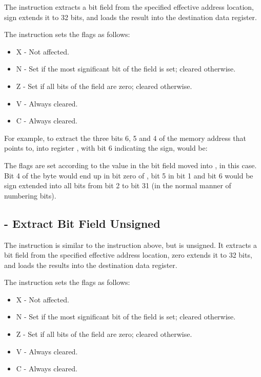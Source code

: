 The  instruction extracts a bit field from the specified effective address location, sign extends it to 32 bits, and loads the result into the destination data register.

The instruction sets the flags as follows:

\begin{itemize}
\item X - Not affected.
\item N - Set if the most significant bit of the field is set; cleared otherwise.
\item Z - Set if all bits of the field are zero; cleared otherwise.
\item V - Always cleared.
\item C - Always cleared.
\end{itemize}

For example, to extract the three bits 6, 5 and 4 of the memory address that  points to, into register , with bit 6 indicating the sign, would be:


The flags are set according to the value in the bit field moved into , in this case. Bit 4 of the byte would end up in bit zero of , bit 5 in bit 1 and bit 6 would be sign extended into all bits from bit 2 to bit 31 (in the normal manner of numbering bits).

\subsection{ - Extract Bit Field Unsigned}

The  instruction is similar to the  instruction above, but is unsigned. It extracts a bit field from the specified effective address location, zero extends it to 32 bits, and loads the results into the destination data register.

The instruction sets the flags as follows:

\begin{itemize}
    \item X - Not affected.
    \item N - Set if the most significant bit of the field is set; cleared otherwise.
    \item Z - Set if all bits of the field are zero; cleared otherwise.
    \item V - Always cleared.
    \item C - Always cleared.
\end{itemize}

